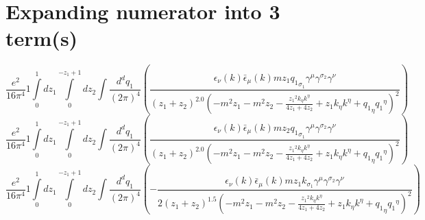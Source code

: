 \section*{Expanding numerator into 3 term(s)}
\begin{dmath}\frac{e^{2}}{16 \pi^{4}}1\int\limits_{ 0 }^{ 1 } d{ z_{ 1 } }\int\limits_{ 0 }^{ - { z_{ 1 } } + 1 } d{ z_{ 2 } }\int\frac{d^d q_1 }{ (2\pi)^4 }\left(\frac{\epsilon_{ \nu }({ k }) \bar{\epsilon}_{ \mu }({ k }) m { z_{ 1 } } { { q_1 }_{ \sigma_1 } } { \gamma^{ \mu } } { \gamma^{ \sigma_2 } } { \gamma^{ \nu } }}{\left({ z_{ 1 } } + { z_{ 2 } }\right)^{2.0} \left(- m^{2} { z_{ 1 } } - m^{2} { z_{ 2 } } - \frac{{ z_{ 1 } }^{2} { { k }_{ \eta } } { { k }^{ \eta } }}{4 { z_{ 1 } } + 4 { z_{ 2 } }} + { z_{ 1 } } { { k }_{ \eta } } { { k }^{ \eta } } + { { q_1 }_{ \eta } } { { q_1 }^{ \eta } }\right)^{2}}\right)\end{dmath}
\begin{dmath}\frac{e^{2}}{16 \pi^{4}}1\int\limits_{ 0 }^{ 1 } d{ z_{ 1 } }\int\limits_{ 0 }^{ - { z_{ 1 } } + 1 } d{ z_{ 2 } }\int\frac{d^d q_1 }{ (2\pi)^4 }\left(\frac{\epsilon_{ \nu }({ k }) \bar{\epsilon}_{ \mu }({ k }) m { z_{ 2 } } { { q_1 }_{ \sigma_1 } } { \gamma^{ \mu } } { \gamma^{ \sigma_2 } } { \gamma^{ \nu } }}{\left({ z_{ 1 } } + { z_{ 2 } }\right)^{2.0} \left(- m^{2} { z_{ 1 } } - m^{2} { z_{ 2 } } - \frac{{ z_{ 1 } }^{2} { { k }_{ \eta } } { { k }^{ \eta } }}{4 { z_{ 1 } } + 4 { z_{ 2 } }} + { z_{ 1 } } { { k }_{ \eta } } { { k }^{ \eta } } + { { q_1 }_{ \eta } } { { q_1 }^{ \eta } }\right)^{2}}\right)\end{dmath}
\begin{dmath}\frac{e^{2}}{16 \pi^{4}}1\int\limits_{ 0 }^{ 1 } d{ z_{ 1 } }\int\limits_{ 0 }^{ - { z_{ 1 } } + 1 } d{ z_{ 2 } }\int\frac{d^d q_1 }{ (2\pi)^4 }\left(- \frac{\epsilon_{ \nu }({ k }) \bar{\epsilon}_{ \mu }({ k }) m { z_{ 1 } } { { k }_{ \sigma_1 } } { \gamma^{ \mu } } { \gamma^{ \sigma_2 } } { \gamma^{ \nu } }}{2 \left({ z_{ 1 } } + { z_{ 2 } }\right)^{1.5} \left(- m^{2} { z_{ 1 } } - m^{2} { z_{ 2 } } - \frac{{ z_{ 1 } }^{2} { { k }_{ \eta } } { { k }^{ \eta } }}{4 { z_{ 1 } } + 4 { z_{ 2 } }} + { z_{ 1 } } { { k }_{ \eta } } { { k }^{ \eta } } + { { q_1 }_{ \eta } } { { q_1 }^{ \eta } }\right)^{2}}\right)\end{dmath}
